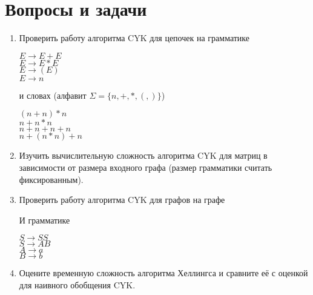 \section{Вопросы и задачи}
\begin{enumerate}
    \item Проверить работу алгоритма CYK для цепочек на грамматике
    \begin{flushleft}
    $E \to E + E$ \\
    $E \to E * E$ \\
    $E \to (E)$   \\
    $E \to n$     \\
    \end{flushleft}
    и словах (алфавит $\Sigma = \{n, +, *, (, )\}$)
    \begin{flushleft}
    $ (n + n) * n$    \\
    $ n + n * n$      \\
    $n + n + n + n$   \\
    $n + (n * n) + n$ \\
    \end{flushleft}

    \item Изучить вычислительную сложность алгоритма CYK для матриц в зависимости от размера входного графа (размер грамматики считать фиксированным).

    \item Проверить работу алгоритма CYK для графов на графе

    \begin{center}
    \end{center}

    И грамматике

    \begin{flushleft}
        $S \to S S$ \\
        $S \to A B$ \\
        $A \to a$   \\
        $B \to b$     \\
    \end{flushleft}

    \item Оцените временную сложность алгоритма Хеллингса и сравните её с оценкой для наивного обобщения CYK.

\end{enumerate}